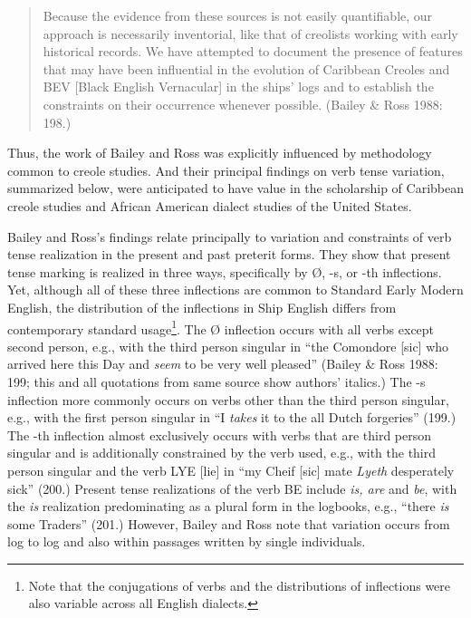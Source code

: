 \documentclass[12pt]{article}
\newenvironment{styleStandard}{\renewcommand\baselinestretch{1.0}\setlength\leftskip{0cm}\setlength\rightskip{0cm plus 1fil}\setlength\parindent{0cm}\setlength\parfillskip{0pt plus 1fil}\setlength\parskip{0in plus 1pt}\writerlistparindent\writerlistleftskip\leavevmode\normalfont\normalsize\writerlistlabel\ignorespaces}{\unskip\vspace{0in plus 1pt}\par}
\newcommand\writerlistleftskip{}
\newcommand\writerlistparindent{}
\newcommand\writerlistlabel{}
\begin{document}
\begin{quotation}
Because the evidence from these sources is not easily quantifiable, our approach is necessarily inventorial, like that of creolists working with early historical records. We have attempted to document the presence of features that may have been influential in the evolution of Caribbean Creoles and BEV [Black English Vernacular] in the ships’ logs and to establish the constraints on their occurrence whenever possible. (Bailey \& Ross 1988: 198.) 

\end{quotation}
\begin{styleStandard}
Thus, the work of Bailey and Ross was explicitly influenced by methodology common to creole studies. And their principal findings on verb tense variation, summarized below, were anticipated to have value in the scholarship of Caribbean creole studies and African American dialect studies of the United States.
\end{styleStandard}


\begin{styleStandard}
Bailey and Ross’s findings relate principally to variation and constraints of verb tense realization in the present and past preterit forms. They show that present tense marking is realized in three ways, specifically by Ø, -s, or -th inflections. Yet, although all of these three inflections are common to Standard Early Modern English, the distribution of the inflections in Ship English differs from contemporary standard usage\footnote{ Note that the conjugations of verbs and the distributions of inflections were also variable across all English dialects.}. The Ø inflection occurs with all verbs except second person, e.g., with the third person singular in “the Comondore [sic] who arrived here this Day and \textit{seem} to be very well pleased” (Bailey \& Ross 1988: 199; this and all quotations from same source show authors’ italics.) The -s inflection more commonly occurs on verbs other than the third person singular, e.g., with the first person singular in “I \textit{takes} it to the all Dutch forgeries” (199.) The -th inflection almost exclusively occurs with verbs that are third person singular and is additionally constrained by the verb used, e.g., with the third person singular and the verb LYE [lie] in “my Cheif [sic] mate\textit{ Lyeth} desperately sick” (200.) Present tense realizations of the verb BE include \textit{is, are }and\textit{ be}, with the\textit{ is} realization predominating as a plural form in the logbooks, e.g., “there \textit{is }some Traders” (201.) However, Bailey and Ross note that variation occurs from log to log and also within passages written by single individuals. 
\end{styleStandard}
\end{document}
